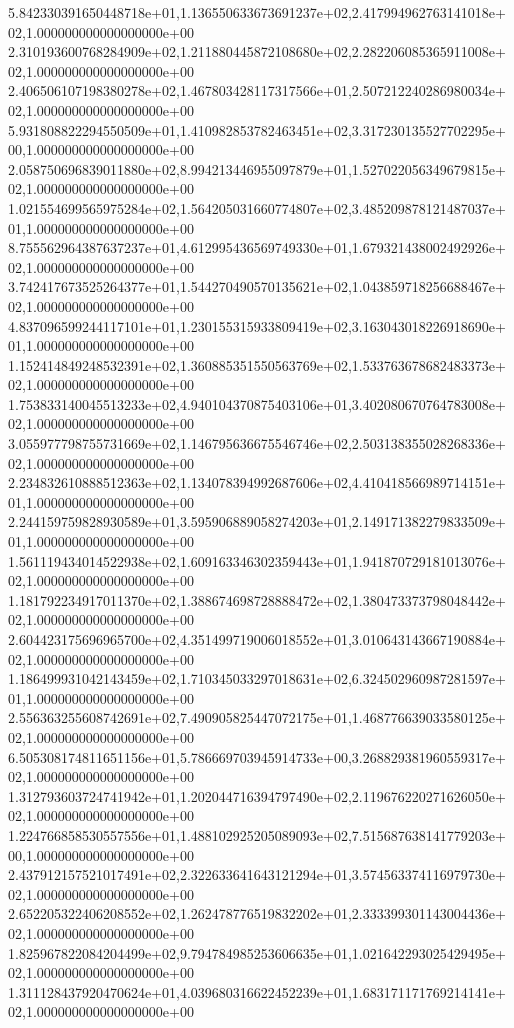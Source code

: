 5.842330391650448718e+01,1.136550633673691237e+02,2.417994962763141018e+02,1.000000000000000000e+00
2.310193600768284909e+02,1.211880445872108680e+02,2.282206085365911008e+02,1.000000000000000000e+00
2.406506107198380278e+02,1.467803428117317566e+01,2.507212240286980034e+02,1.000000000000000000e+00
5.931808822294550509e+01,1.410982853782463451e+02,3.317230135527702295e+00,1.000000000000000000e+00
2.058750696839011880e+02,8.994213446955097879e+01,1.527022056349679815e+02,1.000000000000000000e+00
1.021554699565975284e+02,1.564205031660774807e+02,3.485209878121487037e+01,1.000000000000000000e+00
8.755562964387637237e+01,4.612995436569749330e+01,1.679321438002492926e+02,1.000000000000000000e+00
3.742417673525264377e+01,1.544270490570135621e+02,1.043859718256688467e+02,1.000000000000000000e+00
4.837096599244117101e+01,1.230155315933809419e+02,3.163043018226918690e+01,1.000000000000000000e+00
1.152414849248532391e+02,1.360885351550563769e+02,1.533763678682483373e+02,1.000000000000000000e+00
1.753833140045513233e+02,4.940104370875403106e+01,3.402080670764783008e+02,1.000000000000000000e+00
3.055977798755731669e+02,1.146795636675546746e+02,2.503138355028268336e+02,1.000000000000000000e+00
2.234832610888512363e+02,1.134078394992687606e+02,4.410418566989714151e+01,1.000000000000000000e+00
2.244159759828930589e+01,3.595906889058274203e+01,2.149171382279833509e+01,1.000000000000000000e+00
1.561119434014522938e+02,1.609163346302359443e+01,1.941870729181013076e+02,1.000000000000000000e+00
1.181792234917011370e+02,1.388674698728888472e+02,1.380473373798048442e+02,1.000000000000000000e+00
2.604423175696965700e+02,4.351499719006018552e+01,3.010643143667190884e+02,1.000000000000000000e+00
1.186499931042143459e+02,1.710345033297018631e+02,6.324502960987281597e+01,1.000000000000000000e+00
2.556363255608742691e+02,7.490905825447072175e+01,1.468776639033580125e+02,1.000000000000000000e+00
6.505308174811651156e+01,5.786669703945914733e+00,3.268829381960559317e+02,1.000000000000000000e+00
1.312793603724741942e+01,1.202044716394797490e+02,2.119676220271626050e+02,1.000000000000000000e+00
1.224766858530557556e+01,1.488102925205089093e+02,7.515687638141779203e+00,1.000000000000000000e+00
2.437912157521017491e+02,2.322633641643121294e+01,3.574563374116979730e+02,1.000000000000000000e+00
2.652205322406208552e+02,1.262478776519832202e+01,2.333399301143004436e+02,1.000000000000000000e+00
1.825967822084204499e+02,9.794784985253606635e+01,1.021642293025429495e+02,1.000000000000000000e+00
1.311128437920470624e+01,4.039680316622452239e+01,1.683171171769214141e+02,1.000000000000000000e+00
